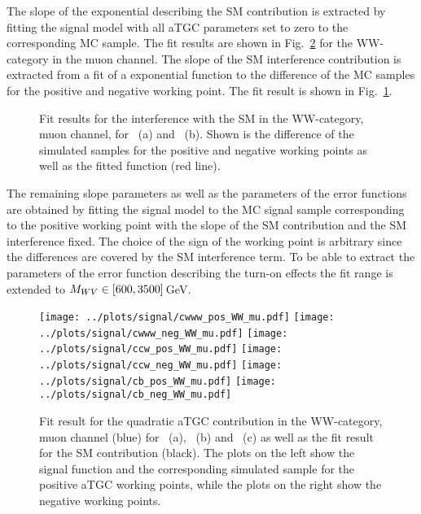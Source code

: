 \noindent The slope of the exponential describing the SM contribution is extracted by fitting the signal model with all aTGC parameters set to zero to the corresponding MC sample. The fit results are shown in Fig.~\ref{fig:signal:WW_mu_sig} for the WW-category in the muon channel. The slope of the SM interference contribution is extracted from a fit of a exponential function to the difference of the MC samples for the positive and negative working point. The fit result is shown in Fig.~\ref{fig:signal:sm_int_WW_mu}.\\
\begin{figure}
	\centering
	\caption[Fit results for the interference with the SM in the WW-category, muon channel]{Fit results for the interference with the SM in the WW-category, muon channel, for \Tccw \ (a) and \Tcb \ (b). Shown is the difference of the simulated samples for the positive and negative working points as well as the fitted function (red line).}
	\label{fig:signal:sm_int_WW_mu}
\end{figure}

\noindent The remaining slope parameters as well as the parameters of the error functions are obtained by fitting the signal model to the MC signal sample corresponding to the positive working point with the slope of the SM contribution and the SM interference fixed. The choice of the sign of the working point is arbitrary since the differences are covered by the SM interference term. To be able to extract the parameters of the error function describing the turn-on effects the fit range is extended to $M_{WV} \in [600,3500]$\,GeV.

\begin{figure}
	\centering
		\texttt{[image: ../plots/signal/cwww\_pos\_WW\_mu.pdf]}
		\texttt{[image: ../plots/signal/cwww\_neg\_WW\_mu.pdf]}
		\texttt{[image: ../plots/signal/ccw\_pos\_WW\_mu.pdf]}
		\texttt{[image: ../plots/signal/ccw\_neg\_WW\_mu.pdf]}
		\texttt{[image: ../plots/signal/cb\_pos\_WW\_mu.pdf]}
		\texttt{[image: ../plots/signal/cb\_neg\_WW\_mu.pdf]}
	\caption[Fit result for the quadratic aTGC contribution in the WW-category, muon channel]{Fit result for the quadratic aTGC contribution in the WW-category, muon channel (blue) for \Tcwww \ (a), \Tccw \ (b) and \Tcb \ (c) as well as the fit result for the SM contribution (black). The plots on the left show the signal function and the corresponding simulated sample for the positive aTGC working points, while the plots on the right show the negative working points.}
	\label{fig:signal:WW_mu_sig}
\end{figure}



